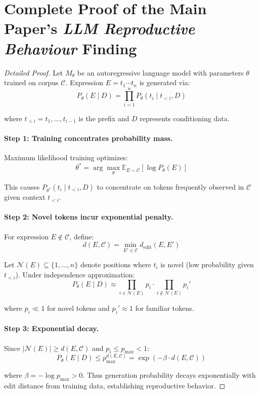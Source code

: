 \documentclass[twoside,11pt]{article}
\providecommand{\qed}{\hfill\BlackBox}
\begin{document}
\appendix

\section{Complete Proof of the Main Paper's \emph{LLM Reproductive Behaviour} Finding}
\label{app:proof}

\begin{proof}[Detailed Proof]
Let $M_\theta$ be an autoregressive language model with parameters $\theta$ trained on corpus $\mathcal{C}$. Expression $E = t_1 \cdots t_n$ is generated via:
\[
P_\theta(E \mid D) = \prod_{i=1}^n P_\theta(t_i \mid t_{<i}, D)
\]

where $t_{<i} = t_1, \ldots, t_{i-1}$ is the prefix and $D$ represents conditioning data.

\paragraph{Step 1: Training concentrates probability mass.}

Maximum likelihood training optimizes:
\[
\theta^* = \arg\max_\theta \mathbb{E}_{E \sim \mathcal{C}}[\log P_\theta(E)]
\]

This causes $P_{\theta^*}(t_i \mid t_{<i}, D)$ to concentrate on tokens frequently observed in $\mathcal{C}$ given context $t_{<i}$.

\paragraph{Step 2: Novel tokens incur exponential penalty.}

For expression $E \notin \mathcal{C}$, define:
\[
d(E, \mathcal{C}) = \min_{E' \in \mathcal{C}} d_{\text{edit}}(E, E')
\]

Let $\mathcal{N}(E) \subseteq \{1, \ldots, n\}$ denote positions where $t_i$ is novel (low probability given $t_{<i}$). Under independence approximation:
\[
P_\theta(E \mid D) \approx \prod_{i \in \mathcal{N}(E)} p_i \cdot \prod_{i \notin \mathcal{N}(E)} p_i'
\]

where $p_i \ll 1$ for novel tokens and $p_i' \approx 1$ for familiar tokens.

\paragraph{Step 3: Exponential decay.}

Since $|\mathcal{N}(E)| \geq d(E, \mathcal{C})$ and $p_i \leq p_{\max} < 1$:
\[
P_\theta(E \mid D) \leq p_{\max}^{d(E, \mathcal{C})} = \exp(-\beta \cdot d(E, \mathcal{C}))
\]

where $\beta = -\log p_{\max} > 0$. Thus generation probability decays exponentially with edit distance from training data, establishing reproductive behavior. \qed
\end{proof}
\end{document}
